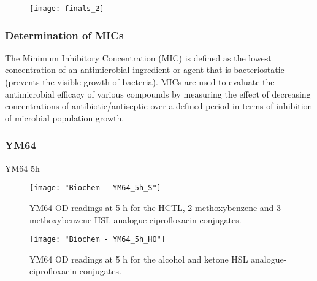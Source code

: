 \begin{figure}[H]
	\begin{center}
		\texttt{[image: finals\_2]}
		\caption{
 		\label{fgr:finals_2}}
	\end{center}
\end{figure}

\subsubsection{Determination of MICs}

The Minimum Inhibitory Concentration (MIC) is defined as the lowest concentration of an antimicrobial ingredient or agent that is bacteriostatic (prevents the visible growth of bacteria). MICs are used to evaluate the antimicrobial efficacy of various compounds by measuring the effect of decreasing concentrations of antibiotic/antiseptic over a defined period in terms of inhibition of microbial population growth.  

\subsubsection{YM64}

YM64 5h

\begin{figure}[H]
	\begin{center}
		\texttt{[image: "Biochem - YM64\_5h\_S"]}
		\caption{YM64 OD readings at 5 h for the HCTL, 2-methoxybenzene and 3-methoxybenzene HSL analogue-ciprofloxacin conjugates.\label{fgr:YM64_5h_S}}
	\end{center}
\end{figure}

\begin{figure}[H]
	\begin{center}
		\texttt{[image: "Biochem - YM64\_5h\_HO"]}
		\caption{YM64 OD readings at 5 h for the alcohol and ketone HSL analogue-ciprofloxacin conjugates.\label{fgr:YM64_5h_HO}}
	\end{center}
\end{figure}



